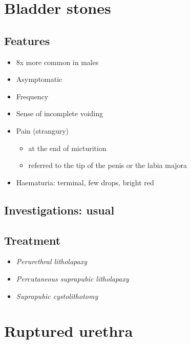 \documentclass[
  12pt,
]{memoir}
\providecommand{\tightlist}{%
  \setlength{\itemsep}{0pt}\setlength{\parskip}{0pt}}
\begin{document}
\pagebreak

\hypertarget{bladder-stones}{%
\section{Bladder stones}\label{bladder-stones}}

\hypertarget{features-5}{%
\subsection{Features}\label{features-5}}

\begin{itemize}
\tightlist
\item
  8x more common in males
\item
  Asymptomatic
\item
  Frequency
\item
  Sense of incomplete voiding
\item
  Pain (strangury)

  \begin{itemize}
  \tightlist
  \item
    at the end of micturition
  \item
    referred to the tip of the penis or the labia majora
  \end{itemize}
\item
  Haematuria: terminal, few drops, bright red
\end{itemize}

\hypertarget{investigations-usual}{%
\subsection{Investigations: usual}\label{investigations-usual}}

\hypertarget{treatment-5}{%
\subsection{Treatment}\label{treatment-5}}

\begin{itemize}
\item
  \emph{Perurethral litholapaxy}
\item
  \emph{Percutaneous suprapubic litholapaxy}
\item
  \emph{Suprapubic cystolithotomy}
\end{itemize}

\hypertarget{ruptured-urethra}{%
\section{Ruptured urethra}\label{ruptured-urethra}}
\end{document}
